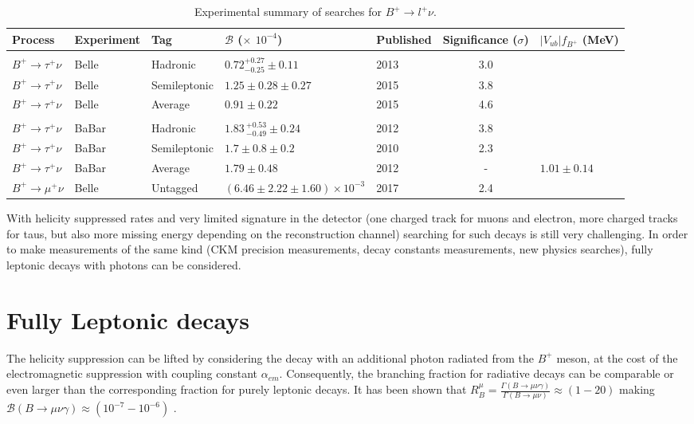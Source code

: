\begin{table}[ht]
\begin{center}
\begin{tabular}{ l l l l H c H} \hline
	Process &Experiment & Tag &${\mathcal{B}}$ ($\times$ $10^{-4}$) & Published & Significance ($\sigma$) & {$|V_{ub}|f_{B^+}$ (MeV)} \hfill\\
\hline\\[-2.5ex]
	$B^{+}\rightarrow \tau^{+}\nu$	&Belle~\cite{Adachi:2012mm}&Hadronic&$0.72^{+0.27}_{-0.25}\pm0.11$  & 2013 & 3.0 \\ 
$B^{+}\rightarrow \tau^{+}\nu$	&Belle~\cite{Kronenbitter:2015kls}&Semileptonic&$1.25\pm0.28\pm0.27$ & 2015 & 3.8 \\
$B^{+}\rightarrow \tau^{+}\nu$	&Belle~\cite{Kronenbitter:2015kls}&Average&$0.91 \pm 0.22$ & 2015 & 4.6 \\\hline\\[-2.5ex]
$B^{+}\rightarrow \tau^{+}\nu$	&BaBar~\cite{Lees:2012ju} & Hadronic & $1.83\,^{+0.53}_{-0.49}\pm0.24$ & 2012 & 3.8 \\ 
$B^{+}\rightarrow \tau^{+}\nu$	&BaBar~\cite{Aubert:2009wt} & Semileptonic & $1.7\pm 0.8\pm 0.2$ & 2010 & 2.3\\ 
$B^{+}\rightarrow \tau^{+}\nu$	&BaBar~\cite{Lees:2012ju} & Average & $1.79 \pm 0.48$ & 2012 & - & $1.01\pm 0.14$  \\ \hline
$B^{+}\rightarrow \mu^{+}\nu$ & Belle~\cite{Sibidanov:2017vph} & Untagged& $(6.46\pm2.22\pm 1.60)\times 10^{-3}$ & 2017 & 2.4 &\\
\hline
\end{tabular}
\end{center}
\caption{Experimental summary of searches for $B^{+}\rightarrow l^{+}\nu$.}
\label{tab:sum}
\end{table}


With helicity suppressed rates and very limited signature in the detector (one charged track for muons and electron, more charged tracks for taus, but also more missing energy depending on the reconstruction channel) searching for such decays is still very challenging. In order to make measurements of the same kind (CKM precision measurements, decay constants measurements, new physics searches), fully leptonic decays with photons can be considered.   

\section{Fully Leptonic  decays}
\label{lnugamma}
The helicity suppression can be lifted by considering the decay with an additional photon radiated from the $B^{+}$ meson, at the cost of the electromagnetic suppression with coupling constant $\alpha_{em}$. Consequently, the branching fraction for radiative decays can be comparable or even larger than the corresponding fraction for purely leptonic decays. It has been shown that $R^{\mu}_{B}=\frac{\Gamma(B\rightarrow \mu \nu \gamma)}{\Gamma(B\rightarrow \mu \nu)}\approx(1-20)$ making $\mathcal{B}(B\rightarrow \mu \nu \gamma)\approx(10^{-7}-10^{-6})$ \cite{Burdman:1994ip}.

